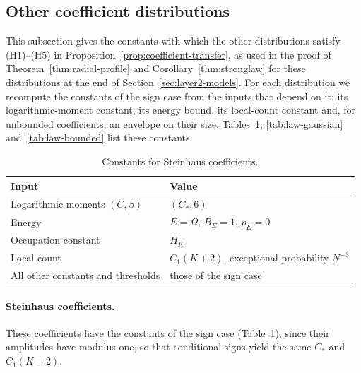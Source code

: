 \subsection{Other coefficient distributions}\label{sec:model-constants}
This subsection gives the constants with which the other distributions
satisfy (H1)--(H5) in Proposition~\ref{prop:coefficient-transfer}, as
used in the proof of Theorem~\ref{thm:radial-profile} and
Corollary~\ref{thm:stronglaw} for these distributions at the end of
Section~\ref{sec:layer2-models}.
For each distribution we recompute the constants of the sign case from
the inputs that depend on it: its logarithmic-moment constant, its energy
bound, its local-count constant and, for unbounded coefficients, an
envelope on their size.
Tables~\ref{tab:law-steinhaus}, \ref{tab:law-gaussian}
and~\ref{tab:law-bounded} list these constants.

\begin{table}[!ht]
\centering
\small
\begin{tabular}{@{}ll@{}}
\toprule
Input & Value\\
\midrule
Logarithmic moments $(C,\beta)$ & $(C_*,6)$\\
Energy & $E=\Omega$, $B_E=1$, $p_E=0$\\
Occupation constant & $H_K$\\
Local count & $C_1(K+2)$, exceptional probability $N^{-3}$\\
All other constants and thresholds & those of the sign case\\
\bottomrule
\end{tabular}
\caption{Constants for Steinhaus coefficients.}
\label{tab:law-steinhaus}
\end{table}

\paragraph{Steinhaus coefficients.}
These coefficients have the constants of the sign case
(Table~\ref{tab:law-steinhaus}), since their amplitudes have modulus
one, so that conditional signs yield the same $C_*$ and $C_1(K+2)$.

